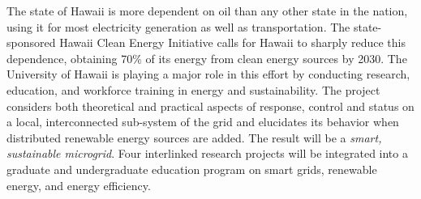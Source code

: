 \documentclass{proposalnsf}
\begin{document}






\noindent The state of Hawaii is more dependent on oil than any other state in the nation, using it for most electricity generation as well as transportation. The state-sponsored Hawaii Clean Energy Initiative calls for Hawaii to sharply reduce this dependence, obtaining 70\% of its energy from clean energy sources by 2030. The University of Hawaii is playing a major role in this effort by conducting research, education, and workforce training in energy and sustainability. The project considers both theoretical and practical aspects of response, control and status on a local, interconnected sub-system of the grid and elucidates its behavior when distributed renewable energy sources are added. The result will be a {\em smart, sustainable microgrid}. Four interlinked research projects will be integrated into a graduate and undergraduate education program on smart grids, renewable energy, and energy efficiency. 
\end{document}
